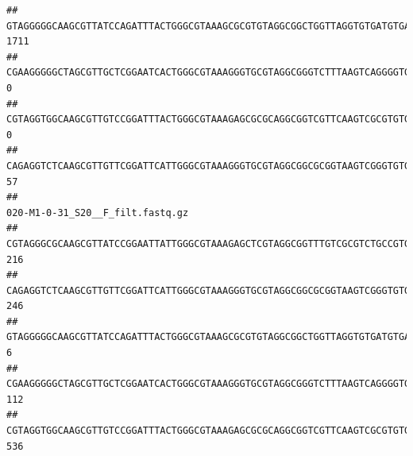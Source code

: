 \documentclass[]{article}
\begin{document}
\begin{verbatim}
## GTAGGGGGCAAGCGTTATCCAGATTTACTGGGCGTAAAGCGCGTGTAGGCGGCTGGTTAGGTGTGATGTGAAATCTTCCGGCTCAACCGGAAAACTGCATTGCAAACCGGCCTGGCTAGAGTGCAGGAGAGGGAAGCGGAATTCCAGGTGTAGCGGTGAAATGCGTAGATATCTGGAGGAACACCAGTGGCGAAGGCGGCTTCCTGGCCTGCAACTGACGCTGAGACGCGAAAGCGTGGGGAGCGAAC                               1711
## CGAAGGGGGCTAGCGTTGCTCGGAATCACTGGGCGTAAAGGGTGCGTAGGCGGGTCTTTAAGTCAGGGGTGAAATCCTGGAGCTCAACTCCAGAACTGCCTTTGATACTGAAGATCTTGAGTTCGGGAGAGGTGAGTGGAACTGCGAGTGTAGAGGTGAAATTCGTAGATATTCGCAAGAACACCAGTGGCGAAGGCGGCTCACTGGCCCGATACTGACGCTGAGGCACGAAAGCGTGGGGAGCAAACA                                 0
## CGTAGGTGGCAAGCGTTGTCCGGATTTACTGGGCGTAAAGAGCGCGCAGGCGGTCGTTCAAGTCGCGTGTGAAAGCCCCCGGCTCAACTGGGGAGGGTCACGCGATACTGATCGACTCGAAGGCAGGAGAGGGTAGTGGAATTCCCGGTGTAGTGGTGAAATGCGTAGATATCGGGAGGAACACCAGTGGCGAAGGCGACTACCTGGCCTGTTCTTGACGCTGAGGCGCGAAAGCTAGGGGAGCAAACG                                 0
## CAGAGGTCTCAAGCGTTGTTCGGATTCATTGGGCGTAAAGGGTGCGTAGGCGGCGCGGTAAGTCGGGTGTGAAATCTCGGGGCTTAACTCCGAAACTGCATTCGATACTGCCGTGCTTGAGGACTGGAGAGGAGACTGGAATTTACGGTGTAGCGGTGAAATGCGTAGATATCGTAAGGAAGACCAGTGGCGAAGGCGGGTCTCTGGACAGTTCCTGACGCTGAGGCACGAAGGCCAGGGGAGCAAACG                                57
##                                                                                                                                                                                                                                                           020-M1-0-31_S20__F_filt.fastq.gz
## CGTAGGGCGCAAGCGTTATCCGGAATTATTGGGCGTAAAGAGCTCGTAGGCGGTTTGTCGCGTCTGCCGTGAAAGTCCGGGGCTCAACTCCGGATCTGCGGTGGGTACGGGCAGACTAGAGTGATGTAGGGGAGACTGGAATTCCTGGTGTAGCGGTGAAATGCGCAGATATCAGGAGGAACACCGATGGCGAAGGCAGGTCTCTGGGCATTAACTGACGCTGAGGAGCGAAAGCATGGGGAGCGAACA                              216
## CAGAGGTCTCAAGCGTTGTTCGGATTCATTGGGCGTAAAGGGTGCGTAGGCGGCGCGGTAAGTCGGGTGTGAAATCTCGGAGCTTAACTCCGAAACTGCATTCGATACTGCCGTGCTTGAGGACTGGAGAGGAGACTGGAATTTACGGTGTAGCGGTGAAATGCGTAGATATCGTAAGGAAGACCAGTGGCGAAGGCGGGTCTCTGGACAGTTCCTGACGCTGAGGCACGAAGGCCAGGGGAGCAAACG                              246
## GTAGGGGGCAAGCGTTATCCAGATTTACTGGGCGTAAAGCGCGTGTAGGCGGCTGGTTAGGTGTGATGTGAAATCTTCCGGCTCAACCGGAAAACTGCATTGCAAACCGGCCTGGCTAGAGTGCAGGAGAGGGAAGCGGAATTCCAGGTGTAGCGGTGAAATGCGTAGATATCTGGAGGAACACCAGTGGCGAAGGCGGCTTCCTGGCCTGCAACTGACGCTGAGACGCGAAAGCGTGGGGAGCGAAC                                 6
## CGAAGGGGGCTAGCGTTGCTCGGAATCACTGGGCGTAAAGGGTGCGTAGGCGGGTCTTTAAGTCAGGGGTGAAATCCTGGAGCTCAACTCCAGAACTGCCTTTGATACTGAAGATCTTGAGTTCGGGAGAGGTGAGTGGAACTGCGAGTGTAGAGGTGAAATTCGTAGATATTCGCAAGAACACCAGTGGCGAAGGCGGCTCACTGGCCCGATACTGACGCTGAGGCACGAAAGCGTGGGGAGCAAACA                              112
## CGTAGGTGGCAAGCGTTGTCCGGATTTACTGGGCGTAAAGAGCGCGCAGGCGGTCGTTCAAGTCGCGTGTGAAAGCCCCCGGCTCAACTGGGGAGGGTCACGCGATACTGATCGACTCGAAGGCAGGAGAGGGTAGTGGAATTCCCGGTGTAGTGGTGAAATGCGTAGATATCGGGAGGAACACCAGTGGCGAAGGCGACTACCTGGCCTGTTCTTGACGCTGAGGCGCGAAAGCTAGGGGAGCAAACG                              536

\end{verbatim}
\end{document}

